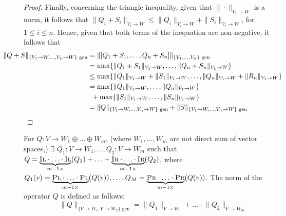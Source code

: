 \begin{proof}
  Finally, concerning the triangle inequality, given that $\|\cdot \|_{V_i \rightarrow W}$ is a norm, it follows that $\|Q_i + S_i\|_{V_i \rightarrow W} \leq \|Q_i\|_{V_i \rightarrow W} + \|S_i\|_{V_i \rightarrow W}$, for $1 \leq i \leq n$. Hence, given that both terms of the inequation are non-negative, it follows that
  \begin{align*}
   \hspace{-30pt} \|Q + S\|_{\{V_1\rightarrow W, \ldots, V_n\rightarrow W\} \text{ gen}} & = \|[Q_1 + S_1, \ldots, Q_n + S_n]\|_{\{V_1, \ldots, V_n\} \text{ gen}} \\
    & = \max \{\|Q_1 + S_1\|_{V_1 \rightarrow W}, \ldots, \|Q_n + S_n\|_{V_1 \rightarrow W}  \} \\
    & \leq \max \{\|Q_1\|_{V_1 \rightarrow W} + \|S_1\|_{V_1 \rightarrow W}, \ldots, \|Q_n\|_{V_1 \rightarrow W} + \|R_n\|_{V_1 \rightarrow W}  \} \\
    & = \max \{\|Q_1\|_{V_1 \rightarrow W}, \ldots, \|Q_n\|_{V_1 \rightarrow W}  \}  \\
    & \hspace{5pt} + \max \{\|S_1\|_{V_1 \rightarrow W}, \ldots, \|S_n\|_{V_1 \rightarrow W}  \} \\
    & = \|Q\|_{\{V_1\rightarrow W, \ldots, V_n\rightarrow W\} \text{ gen}} + \|S\|_{\{V_1\rightarrow W, \ldots, V_n\rightarrow W\} \text{ gen}}
  \end{align*}
\end {proof}




\vspace{5pt}


\begin{definition} \label{def:gen_norm_gen_inj}
  For $Q: V \rightarrow W_1 \oplus \ldots \oplus W_m$, (where  $W_1, \ldots, W_m$  are not direct sum of vector spaces,) $\exists$ $Q_1: V \rightarrow W_1, \ldots,Q_2: V \rightarrow W_m$ such that $Q = \underbrace{\textsc{Il} \cdot \ldots \cdot \textsc{Il}}_{m-1 \times }(Q_1) + \ldots +  \underbrace{\textsc{Ir} \cdot \ldots \cdot \textsc{Ir}}_{m-1 \times } (Q_2)$, where $Q_1 (v) = \underbrace{\textsc{Pl} \cdot \ldots \cdot \textsc{Pl}}_{m-1 \times } (Q (v)), \ldots, Q_M =  \underbrace{\textsc{Pr} \cdot \ldots \cdot \textsc{Pr}}_{m-1 \times } (Q(v))$. The norm of the operator $Q$ is defined as follows:
  \begin{equation}
    \|Q\|_{\{V \rightarrow W_1, V \rightarrow W_2\} \text{ gen}} =  \| Q_1\|_{V \rightarrow W_1} + \ldots + \|Q_2\|_{V \rightarrow W_m}
  \end{equation}
\end{definition}

